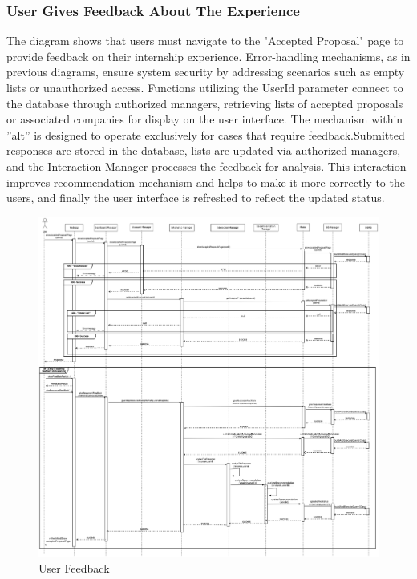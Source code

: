\documentclass[a4paper,12pt]{article}
\begin{document}
\newpage

\subsubsection*{User Gives Feedback About The Experience}
The diagram shows that users must navigate to the "Accepted Proposal" page to provide feedback on their internship experience. Error-handling mechanisms, as in previous diagrams, ensure system security by addressing scenarios such as empty lists or unauthorized access. Functions utilizing the UserId parameter connect to the database through authorized managers, retrieving lists of accepted proposals or associated companies for display on the user interface. The mechanism within ''alt'' is designed to operate exclusively for cases that require feedback.Submitted responses are stored in the database, lists are updated via authorized managers, and the Interaction Manager processes the feedback for analysis. This interaction improves recommendation mechanism and helps to make it more correctly to the users, and finally the user interface is refreshed to reflect the updated status.
    \begin{figure}[H]
    \centering
    \includegraphics[scale = 0.22]{DD_figures/RuntimeView/userGivesFeedback.drawio.png}
    \caption{User Feedback}
\end{figure}
\end{document}
